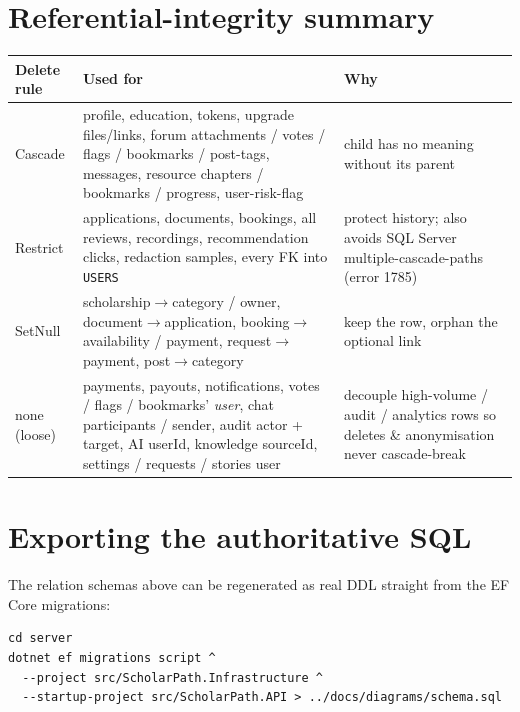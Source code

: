 \documentclass[11pt,a4paper]{article}
\begin{document}
\section{Referential-integrity summary}
\begin{longtable}{@{}p{2.6cm}p{6.2cm}p{5.6cm}@{}}
\toprule
\textbf{Delete rule} & \textbf{Used for} & \textbf{Why}\\
\midrule\endhead
Cascade & profile, education, tokens, upgrade files/links, forum
attachments / votes / flags / bookmarks / post-tags, messages, resource
chapters / bookmarks / progress, user-risk-flag & child has no meaning without
its parent\\
Restrict & applications, documents, bookings, all reviews, recordings,
recommendation clicks, redaction samples, every FK into \texttt{USERS} & protect
history; also avoids SQL Server multiple-cascade-paths (error 1785)\\
SetNull & scholarship$\rightarrow$category / owner, document$\rightarrow$application,
booking$\rightarrow$availability / payment, request$\rightarrow$payment,
post$\rightarrow$category & keep the row, orphan the optional link\\
none (loose) & payments, payouts, notifications, votes / flags / bookmarks'
\emph{user}, chat participants / sender, audit actor + target, AI userId,
knowledge sourceId, settings / requests / stories user & decouple high-volume /
audit / analytics rows so deletes \& anonymisation never cascade-break\\
\bottomrule
\end{longtable}

\section{Exporting the authoritative SQL}
The relation schemas above can be regenerated as real DDL straight from the EF
Core migrations:
{\footnotesize\begin{verbatim}
cd server
dotnet ef migrations script ^
  --project src/ScholarPath.Infrastructure ^
  --startup-project src/ScholarPath.API > ../docs/diagrams/schema.sql
\end{verbatim}}
\end{document}
